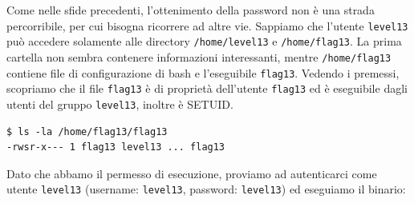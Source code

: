 Come nelle sfide precedenti, l'ottenimento della password non è una strada percorribile, per cui bisogna ricorrere ad altre vie. Sappiamo che l'utente \texttt{level13} può accedere solamente alle directory \texttt{/home/level13} e \texttt{/home/flag13}. La prima cartella non sembra contenere informazioni interessanti, mentre \texttt{/home/flag13} contiene file di configurazione di bash e l'eseguibile \texttt{flag13}. Vedendo i premessi, scopriamo che il file \texttt{flag13} è di proprietà dell'utente \texttt{flag13} ed è eseguibile dagli utenti del gruppo \texttt{level13}, inoltre è SETUID.

\begin{mdframed}[backgroundcolor=white!20,shadow=false]
\begin{lstlisting}
$ ls -la /home/flag13/flag13
-rwsr-x--- 1 flag13 level13 ... flag13
\end{lstlisting}
\end{mdframed}
Dato che abbamo il permesso di esecuzione, proviamo ad autenticarci come utente \texttt{level13} (username: \texttt{level13}, password: \texttt{level13}) ed eseguiamo il binario:

